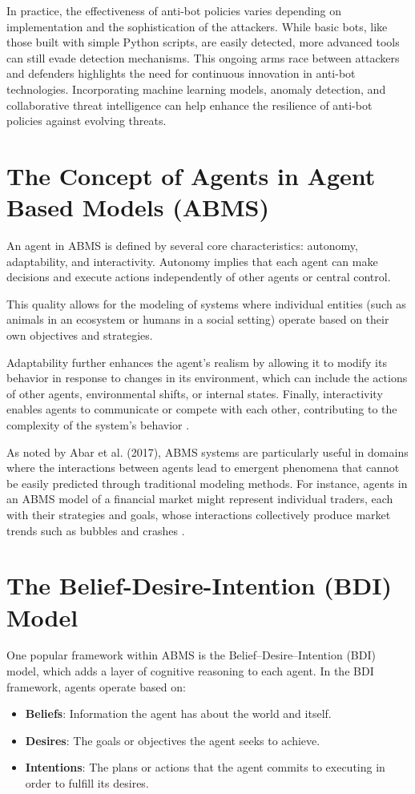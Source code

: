 In practice, the effectiveness of anti-bot policies varies depending on implementation and the sophistication of the attackers. While basic bots, like those built with simple Python scripts, are easily detected, more advanced tools can still evade detection mechanisms. This ongoing arms race between attackers and defenders highlights the need for continuous innovation in anti-bot technologies. Incorporating machine learning models, anomaly detection, and collaborative threat intelligence can help enhance the resilience of anti-bot policies against evolving threats.


\section{The Concept of Agents in Agent Based Models (ABMS)}

An agent in ABMS is defined by several core characteristics: autonomy, adaptability, and interactivity. Autonomy implies that each agent can make decisions and execute actions independently of other agents or central control.

This quality allows for the modeling of systems where individual entities (such as animals in an ecosystem or humans in a social setting) operate based on their own objectives and strategies. 

Adaptability further enhances the agent's realism by allowing it to modify its behavior in response to changes in its environment, which can include the actions of other agents, environmental shifts, or internal states. Finally, interactivity enables agents to communicate or compete with each other, contributing to the complexity of the system’s behavior \cite{3}.

As noted by Abar et al. (2017), ABMS systems are particularly useful in domains where the interactions between agents lead to emergent phenomena that cannot be easily predicted through traditional modeling methods. For instance, agents in an ABMS model of a financial market might represent individual traders, each with their strategies and goals, whose interactions collectively produce market trends such as bubbles and crashes \cite{3}.

\section{The Belief-Desire-Intention (BDI) Model}

One popular framework within ABMS is the Belief–Desire–Intention (BDI) model, which adds a layer of cognitive reasoning to each agent. In the BDI framework, agents operate based on:
\begin{itemize}
    \item \textbf{Beliefs}: Information the agent has about the world and itself.
    \item \textbf{Desires}: The goals or objectives the agent seeks to achieve.
    \item \textbf{Intentions}: The plans or actions that the agent commits to executing in order to fulfill its desires.
\end{itemize}

